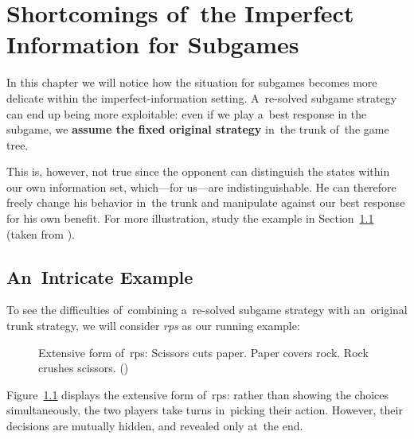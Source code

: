 \chapter{Shortcomings of~the Imperfect Information for Subgames}
\label{ch:imperf-shortcomings}
In this chapter we will notice how the situation for subgames becomes more delicate within the imperfect-information setting.
A~re-solved subgame strategy can end up being more exploitable:
even if we play a~best response in the subgame, we \textbf{assume the fixed original strategy} in~the trunk of~the game tree.

This is, however, not true since the opponent can distinguish the states within our own information set, which---for us---are indistinguishable.
He can therefore freely change his behavior in~the trunk and manipulate against our best response for his own benefit.
For more illustration, study the example in Section~\ref{sec:intricate-ex} (taken from \cite{BurchJohansonBowling2014}).

\section{An~Intricate Example}
\label{sec:intricate-ex}
To see the difficulties of~combining a~re-solved subgame strategy with an~original trunk strategy, we will consider \emph{\acrshort{rps}} as our running example:
\begin{figure}[H]
  \centering
  \scriptsize
  \def\svgwidth{.45\textwidth}
  
  \def\captionTitle{Extensive form of~\acrshort{rps}}
  \caption[\captionTitle]{\captionTitle: Scissors cuts paper. Paper covers rock. Rock crushes scissors. (\cite{Ganzfried2015endgame, BurchJohansonBowling2014})}
  \label{fig:game-tree-rock-paper-scissors}
\end{figure}

Figure~\ref{fig:game-tree-rock-paper-scissors} displays the extensive form of~\acrshort{rps}:
rather than showing the choices simultaneously, the two players take turns in~picking their action.
However, their decisions are mutually hidden, and revealed only at~the end.

